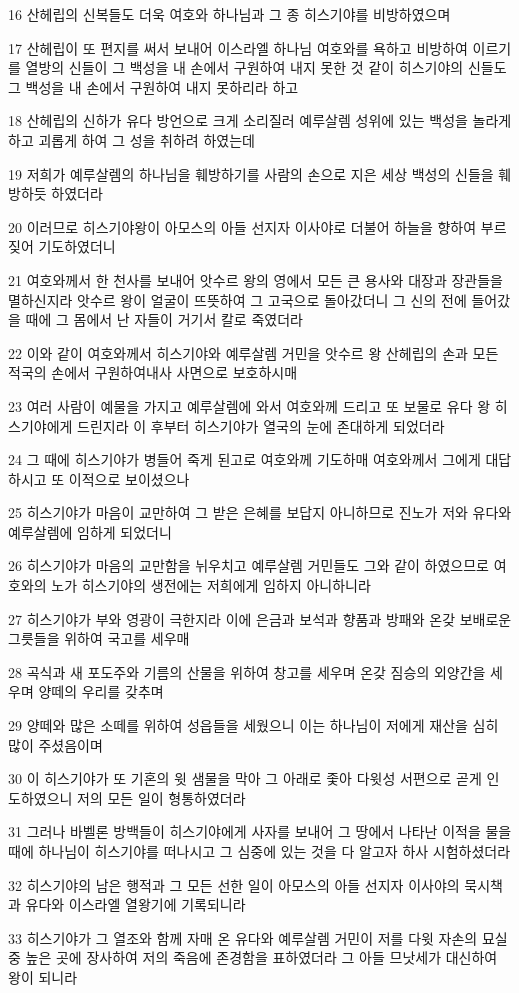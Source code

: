 \par 16 산헤립의 신복들도 더욱 여호와 하나님과 그 종 히스기야를 비방하였으며
\par 17 산헤립이 또 편지를 써서 보내어 이스라엘 하나님 여호와를 욕하고 비방하여 이르기를 열방의 신들이 그 백성을 내 손에서 구원하여 내지 못한 것 같이 히스기야의 신들도 그 백성을 내 손에서 구원하여 내지 못하리라 하고
\par 18 산헤립의 신하가 유다 방언으로 크게 소리질러 예루살렘 성위에 있는 백성을 놀라게 하고 괴롭게 하여 그 성을 취하려 하였는데
\par 19 저희가 예루살렘의 하나님을 훼방하기를 사람의 손으로 지은 세상 백성의 신들을 훼방하듯 하였더라
\par 20 이러므로 히스기야왕이 아모스의 아들 선지자 이사야로 더불어 하늘을 향하여 부르짖어 기도하였더니
\par 21 여호와께서 한 천사를 보내어 앗수르 왕의 영에서 모든 큰 용사와 대장과 장관들을 멸하신지라 앗수르 왕이 얼굴이 뜨뜻하여 그 고국으로 돌아갔더니 그 신의 전에 들어갔을 때에 그 몸에서 난 자들이 거기서 칼로 죽였더라
\par 22 이와 같이 여호와께서 히스기야와 예루살렘 거민을 앗수르 왕 산헤립의 손과 모든 적국의 손에서 구원하여내사 사면으로 보호하시매
\par 23 여러 사람이 예물을 가지고 예루살렘에 와서 여호와께 드리고 또 보물로 유다 왕 히스기야에게 드린지라 이 후부터 히스기야가 열국의 눈에 존대하게 되었더라
\par 24 그 때에 히스기야가 병들어 죽게 된고로 여호와께 기도하매 여호와께서 그에게 대답하시고 또 이적으로 보이셨으나
\par 25 히스기야가 마음이 교만하여 그 받은 은혜를 보답지 아니하므로 진노가 저와 유다와 예루살렘에 임하게 되었더니
\par 26 히스기야가 마음의 교만함을 뉘우치고 예루살렘 거민들도 그와 같이 하였으므로 여호와의 노가 히스기야의 생전에는 저희에게 임하지 아니하니라
\par 27 히스기야가 부와 영광이 극한지라 이에 은금과 보석과 향품과 방패와 온갖 보배로운 그릇들을 위하여 국고를 세우매
\par 28 곡식과 새 포도주와 기름의 산물을 위하여 창고를 세우며 온갖 짐승의 외양간을 세우며 양떼의 우리를 갖추며
\par 29 양떼와 많은 소떼를 위하여 성읍들을 세웠으니 이는 하나님이 저에게 재산을 심히 많이 주셨음이며
\par 30 이 히스기야가 또 기혼의 윗 샘물을 막아 그 아래로 좇아 다윗성 서편으로 곧게 인도하였으니 저의 모든 일이 형통하였더라
\par 31 그러나 바벨론 방백들이 히스기야에게 사자를 보내어 그 땅에서 나타난 이적을 물을 때에 하나님이 히스기야를 떠나시고 그 심중에 있는 것을 다 알고자 하사 시험하셨더라
\par 32 히스기야의 남은 행적과 그 모든 선한 일이 아모스의 아들 선지자 이사야의 묵시책과 유다와 이스라엘 열왕기에 기록되니라
\par 33 히스기야가 그 열조와 함께 자매 온 유다와 예루살렘 거민이 저를 다윗 자손의 묘실 중 높은 곳에 장사하여 저의 죽음에 존경함을 표하였더라 그 아들 므낫세가 대신하여 왕이 되니라

